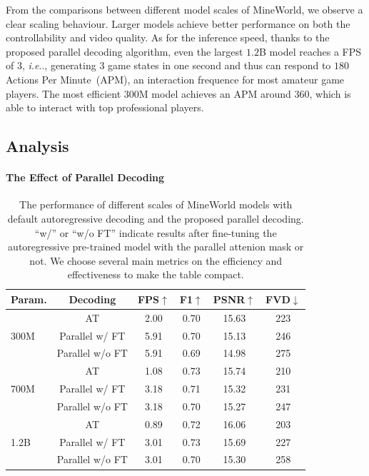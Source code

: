 \documentclass{article} %
\makeatletter
\DeclareRobustCommand\onedot{\futurelet\@let@token\@onedot}
\def\@onedot{\ifx\@let@token.\else.\null\fi\xspace}
\def\ie{\emph{i.e}\onedot} \def\Ie{\emph{I.e}\onedot}
\makeatother
\begin{document}
From the comparisons between different model scales of MineWorld, we observe a clear scaling behaviour. Larger models achieve better performance on both the controllability and video quality. As for the inference speed, thanks to the proposed parallel decoding algorithm, even the largest $1.2$B model reaches a FPS of $3$, \ie, generating $3$ game states in one second and thus can respond to $180$ Actions Per Minute~(APM), an interaction frequence for most amateur game players. The most efficient $300$M model achieves an APM around $360$, which is able to interact with top professional players.

\subsection{Analysis}
\label{sec:analysis}

\paragraph{The Effect of Parallel Decoding}

\begin{table}[tb]
\begin{center}
\small
\caption{The performance of different scales of MineWorld models with default autoregressive decoding and the proposed parallel decoding. ``w/'' or ``w/o FT'' indicate results after fine-tuning the autoregressive pre-trained model with the parallel attenion mask or not. We choose several main metrics on the efficiency and effectiveness to make the table compact.}
	\label{tab:parallel}
        \setlength\tabcolsep{10pt}
	\begin{tabular}{lc|cccc}
		\toprule[1pt]
		Param. & Decoding & FPS$\uparrow$ & F1$\uparrow$ & PSNR$\uparrow$ & FVD$\downarrow$ \\
		\midrule
		\multirow{3}{*}{300M} & AT & 2.00 & 0.70 & 15.63 & 223  \\
        	                 & Parallel w/ FT & 5.91 & 0.70 & 15.13 & 246   \\
        	                 & Parallel w/o FT & 5.91 & 0.69 & 14.98 &  275 \\
        \midrule
		\multirow{3}{*}{700M} & AT  & 1.08 & 0.73  & 15.74 & 210 \\
        	                 & Parallel w/ FT & 3.18 &  0.71  & 15.32 & 231  \\
        	                 & Parallel w/o FT & 3.18 & 0.70 & 15.27 & 247 \\ 
        \midrule
		\multirow{3}{*}{1.2B} & AT & 0.89 & 0.72 & 16.06 &  203 \\
        	                 & Parallel w/ FT & 3.01 & 0.73 & 15.69 & 227  \\
        	                 & Parallel w/o FT & 3.01 & 0.70 & 15.30 & 258  \\
		\bottomrule[1pt]
	\end{tabular}
 \vspace{-3mm}
\end{center}
\end{table}
\end{document}
